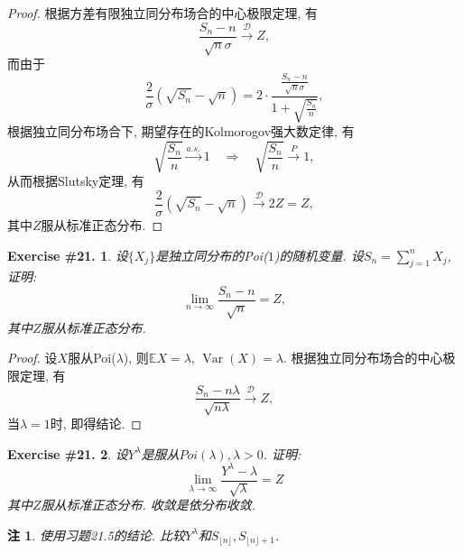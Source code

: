\documentclass[UTF8, a4paper]{article}
\newtheorem{exercise}{Exercise \#21.}
\newtheorem*{remark}{注}
\begin{document}
\begin{proof}
根据方差有限独立同分布场合的中心极限定理, 有
$$
\frac{S_n - n}{\sqrt{n} \sigma} \xrightarrow{\mathcal{D}} Z,
$$
而由于
$$
\frac{2}{\sigma}\left(\sqrt{S_n}-\sqrt{n}\right) = 2\cdot \frac{\frac{S_n - n}{\sqrt{n} \sigma}}{1+ \sqrt{\frac{S_n}{n}}},
$$
根据独立同分布场合下, 期望存在的Kolmorogov强大数定律, 有
$$
\sqrt{\frac{S_n}{n}} \xrightarrow{a.s.} 1 \quad \Rightarrow \quad \sqrt{\frac{S_n}{n}} \xrightarrow{P} 1,
$$
从而根据Slutsky定理, 有
$$
\frac{2}{\sigma}\left(\sqrt{S_n}-\sqrt{n}\right) \xrightarrow{\mathcal{D}} 2Z = Z,
$$
其中\(Z\)服从标准正态分布.
\end{proof}


\begin{framed}
\begin{exercise}
设\(\{X_j\}\)是独立同分布的Poi(\(1\))的随机变量. 设\(S_n = \sum_{j=1}^{n}X_j\), 证明:
$$
\lim_{n\to\infty}\frac{S_n - n}{\sqrt{n}} = Z, 
$$
其中\(Z\)服从标准正态分布.
\end{exercise}
\end{framed}

\begin{proof}
设\(X\)服从Poi(\(\lambda\)), 则\(\mathbb{E}X = \lambda\), \(\operatorname{Var}(X) = \lambda\).
根据独立同分布场合的中心极限定理, 有
$$
\frac{S_n - n\lambda}{\sqrt{n\lambda}} \xrightarrow{\mathcal{D}} Z,
$$
当\(\lambda = 1\)时, 即得结论.
\end{proof}


\begin{framed}
\begin{exercise}
设\(Y^\lambda\)是服从\(Poi(\lambda), \lambda > 0\). 证明: 
$$
\lim _{\lambda \rightarrow \infty} \frac{Y^\lambda-\lambda}{\sqrt{\lambda}}=Z
$$
其中\(Z\)服从标准正态分布. 收敛是依分布收敛.
\end{exercise}
\end{framed}

\begin{remark}
使用习题21.5的结论. 比较\(Y^\lambda\)和\(S_{\lfloor n \rfloor}, S_{\lfloor n \rfloor + 1}\).
\end{remark}
\end{document}
